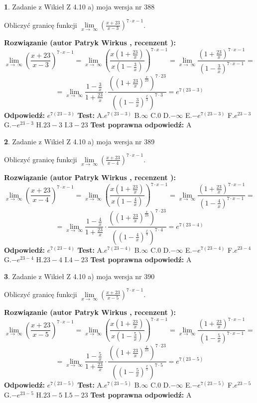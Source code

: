 \documentclass[12pt, a4paper]{article}
\theoremstyle{definition} %
\newtheorem{zad}{}
\newcommand{\zadStart}[1]{\begin{zad}#1\newline}
\newcommand{\zadStop}{\end{zad}}
\newcommand{\rozwStart}[2]{\noindent \textbf{Rozwiązanie (autor #1 , recenzent #2): }\newline}
\newcommand{\rozwStop}{\newline}
\newcommand{\odpStart}{\noindent \textbf{Odpowiedź:}\newline}
\newcommand{\odpStop}{\newline}
\newcommand{\testStart}{\noindent \textbf{Test:}\newline}
\newcommand{\testStop}{\newline}
\newcommand{\kluczStart}{\noindent \textbf{Test poprawna odpowiedź:}\newline}
\newcommand{\kluczStop}{\newline}
\begin{document}
\zadStart{Zadanie z Wikieł Z 4.10 a) moja wersja nr 388}


Obliczyć granicę funkcji  $\lim\limits_{x\to\ \infty}(\frac{x+23}{x-3})^{7\cdot x-1}$.
\zadStop
\rozwStart{Patryk Wirkus}{}
$$\lim\limits_{x\to\ \infty}(\frac{x+23}{x-3})^{7\cdot x-1} = \lim\limits_{x\to\ \infty}(\frac{x(1+\frac{23}{x})}{x(1-\frac{3}{x})})^{7\cdot x-1}=\lim\limits_{x\to\ \infty}\frac{(1+\frac{23}{x})^{7\cdot x-1}}{(1-\frac{3}{x})^{7\cdot x-1}}=$$
$$=\lim\limits_{x\to\ \infty}\frac{1-\frac{3}{x}}{1+\frac{23}{x}}\cdot\frac{((1+\frac{23}{x})^{\frac{x}{23}})^{7\cdot23}}{((1-\frac{3}{x})^{\frac{x}{3}})^{7\cdot3}}=e^{7(23-3)}$$
\rozwStop
\odpStart
$e^{7(23-3)}$
\odpStop
\testStart
A.$e^{7(23-3)}$ B.$\infty$ C.$0$ D.$-\infty$ E.$-e^{7(23-3)}$
F.$e^{23-3}$ G.$-e^{23-3}$
H.$23-3$
I.$3-23$
\testStop
\kluczStart
A
\kluczStop



\zadStart{Zadanie z Wikieł Z 4.10 a) moja wersja nr 389}


Obliczyć granicę funkcji  $\lim\limits_{x\to\ \infty}(\frac{x+23}{x-4})^{7\cdot x-1}$.
\zadStop
\rozwStart{Patryk Wirkus}{}
$$\lim\limits_{x\to\ \infty}(\frac{x+23}{x-4})^{7\cdot x-1} = \lim\limits_{x\to\ \infty}(\frac{x(1+\frac{23}{x})}{x(1-\frac{4}{x})})^{7\cdot x-1}=\lim\limits_{x\to\ \infty}\frac{(1+\frac{23}{x})^{7\cdot x-1}}{(1-\frac{4}{x})^{7\cdot x-1}}=$$
$$=\lim\limits_{x\to\ \infty}\frac{1-\frac{4}{x}}{1+\frac{23}{x}}\cdot\frac{((1+\frac{23}{x})^{\frac{x}{23}})^{7\cdot23}}{((1-\frac{4}{x})^{\frac{x}{4}})^{7\cdot4}}=e^{7(23-4)}$$
\rozwStop
\odpStart
$e^{7(23-4)}$
\odpStop
\testStart
A.$e^{7(23-4)}$ B.$\infty$ C.$0$ D.$-\infty$ E.$-e^{7(23-4)}$
F.$e^{23-4}$ G.$-e^{23-4}$
H.$23-4$
I.$4-23$
\testStop
\kluczStart
A
\kluczStop



\zadStart{Zadanie z Wikieł Z 4.10 a) moja wersja nr 390}


Obliczyć granicę funkcji  $\lim\limits_{x\to\ \infty}(\frac{x+23}{x-5})^{7\cdot x-1}$.
\zadStop
\rozwStart{Patryk Wirkus}{}
$$\lim\limits_{x\to\ \infty}(\frac{x+23}{x-5})^{7\cdot x-1} = \lim\limits_{x\to\ \infty}(\frac{x(1+\frac{23}{x})}{x(1-\frac{5}{x})})^{7\cdot x-1}=\lim\limits_{x\to\ \infty}\frac{(1+\frac{23}{x})^{7\cdot x-1}}{(1-\frac{5}{x})^{7\cdot x-1}}=$$
$$=\lim\limits_{x\to\ \infty}\frac{1-\frac{5}{x}}{1+\frac{23}{x}}\cdot\frac{((1+\frac{23}{x})^{\frac{x}{23}})^{7\cdot23}}{((1-\frac{5}{x})^{\frac{x}{5}})^{7\cdot5}}=e^{7(23-5)}$$
\rozwStop
\odpStart
$e^{7(23-5)}$
\odpStop
\testStart
A.$e^{7(23-5)}$ B.$\infty$ C.$0$ D.$-\infty$ E.$-e^{7(23-5)}$
F.$e^{23-5}$ G.$-e^{23-5}$
H.$23-5$
I.$5-23$
\testStop
\kluczStart
A
\kluczStop
\end{document}
